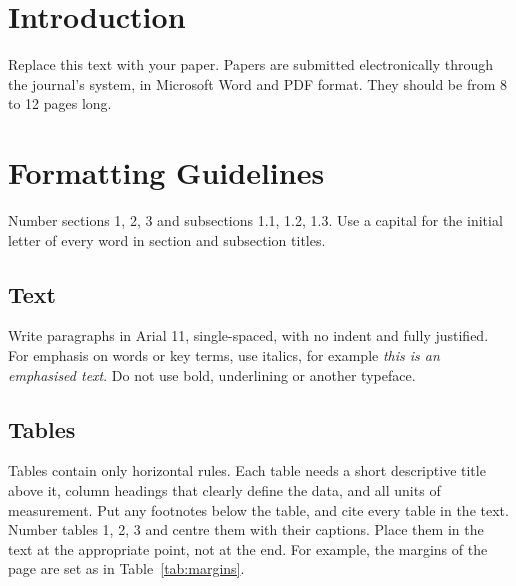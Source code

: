 \documentclass[11pt,a4paper]{article}
\begin{document}



\section{Introduction}
\label{sec:intro}

Replace this text with your paper. Papers are submitted electronically through the journal's system, in Microsoft Word and PDF format. They should be from 8 to 12 pages long.

\section{Formatting Guidelines}
\label{sec:format}

Number sections 1, 2, 3 and subsections 1.1, 1.2, 1.3. Use a capital for the initial letter of every word in section and subsection titles.

\subsection{Text}

Write paragraphs in Arial 11, single-spaced, with no indent and fully justified. For emphasis on words or key terms, use italics, for example \emph{this is an emphasised text}. Do not use bold, underlining or another typeface.

\subsection{Tables}

Tables contain only horizontal rules. Each table needs a short descriptive title above it, column headings that clearly define the data, and all units of measurement. Put any footnotes below the table, and cite every table in the text. Number tables 1, 2, 3 and centre them with their captions. Place them in the text at the appropriate point, not at the end. For example, the margins of the page are set as in Table~\ref{tab:margins}.
\end{document}
